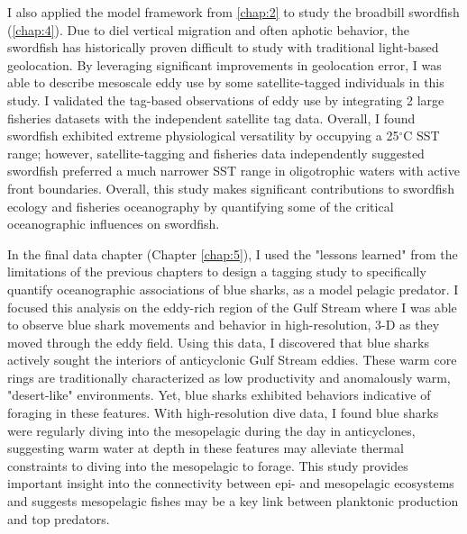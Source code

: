I also applied the model framework from \cref{chap:2} to study the broadbill swordfish (\cref{chap:4}). Due to diel vertical migration and often aphotic behavior, the swordfish has historically proven difficult to study with traditional light-based geolocation. By leveraging significant improvements in geolocation error, I was able to describe mesoscale eddy use by some satellite-tagged individuals in this study. I validated the tag-based observations of eddy use by integrating 2 large fisheries datasets with the independent satellite tag data. Overall, I found swordfish exhibited extreme physiological versatility by occupying a 25$^\circ$C SST range; however, satellite-tagging and fisheries data independently suggested swordfish preferred a much narrower SST range in oligotrophic waters with active front boundaries. Overall, this study makes significant contributions to swordfish ecology and fisheries oceanography by quantifying some of the critical oceanographic influences on swordfish.

In the final data chapter (Chapter \ref{chap:5}), I used the "lessons learned" from the limitations of the previous chapters to design a tagging study to specifically quantify oceanographic associations of blue sharks, as a model pelagic predator. I focused this analysis on the eddy-rich region of the Gulf Stream where I was able to observe blue shark movements and behavior in high-resolution, 3-D as they moved through the eddy field. Using this data, I discovered that blue sharks actively sought the interiors of anticyclonic Gulf Stream eddies. These warm core rings are traditionally characterized as low productivity and anomalously warm, "desert-like" environments. Yet, blue sharks exhibited behaviors indicative of foraging in these features. With high-resolution dive data, I found blue sharks were regularly diving into the mesopelagic during the day in anticyclones, suggesting warm water at depth in these features may alleviate thermal constraints to diving into the mesopelagic to forage. This study provides important insight into the connectivity between epi- and mesopelagic ecosystems and suggests mesopelagic fishes may be a key link between planktonic production and top predators.


